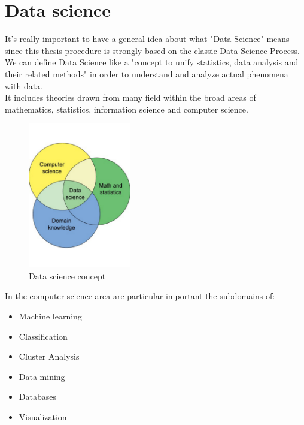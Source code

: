 
\section{Data science}
It's really important to have a general idea about what "Data Science" means since this thesis procedure is strongly based on the classic Data Science Process.\\
We can define Data Science like a "concept to unify statistics, data analysis and their related methods" in order to understand and analyze actual phenomena with data.\\
It includes theories drawn from many field within the broad areas of mathematics, statistics, information science and computer science.

\begin{figure}[H]
	\centering
    \includegraphics[trim={0 3cm 0 3cm},clip,width=0.4\textwidth]{Files/Data_Science_Concept.pdf}
    \caption{Data science concept}
    \label{fig: Data_science}
\end{figure}

\newpage

In the computer science area are particular important the subdomains of:
\begin{itemize}
\item Machine learning
\item Classification
\item Cluster Analysis
\item Data mining
\item Databases
\item Visualization
\end{itemize}

